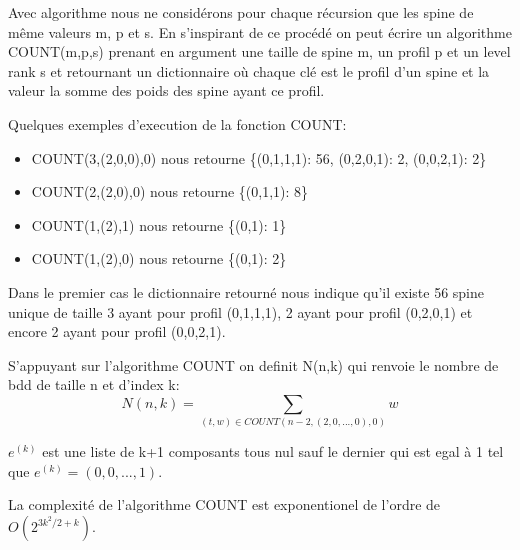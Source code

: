 \documentclass[french]{article}
\begin{document}
Avec algorithme nous ne considérons pour chaque récursion que les spine de même valeurs m, p et s. 
En s'inspirant de ce procédé on peut écrire un algorithme COUNT(m,p,s) prenant en argument une taille de spine m, un profil p et un level rank s et retournant un dictionnaire où chaque clé est le profil d'un spine et la valeur la somme des poids des spine ayant ce profil. 

Quelques exemples d'execution de la fonction COUNT:
\begin{itemize}
    \item COUNT(3,(2,0,0),0) nous retourne \{(0,1,1,1): 56, (0,2,0,1): 2, (0,0,2,1): 2\}
    \item COUNT(2,(2,0),0) nous retourne  \{(0,1,1): 8\}
    \item COUNT(1,(2),1) nous retourne \{(0,1): 1\}
    \item COUNT(1,(2),0) nous retourne \{(0,1): 2\}
\end{itemize}

Dans le premier cas le dictionnaire retourné nous indique qu'il existe 56 spine unique de taille 3 ayant pour profil (0,1,1,1), 2 ayant pour profil (0,2,0,1) et encore 2 ayant pour profil (0,0,2,1).

\vspace{5mm} %

S'appuyant sur l'algorithme COUNT on definit N(n,k) qui renvoie le nombre de bdd de taille n et d'index k:
\[N(n,k)=\underset{(t,w)\in COUNT(n-2,(2,0,...,0),0)}{\sum} w\]

\(e^{(k)}\) est une liste de k+1 composants tous nul sauf le dernier qui est egal à 1 tel que \(e^{(k)} = (0,0,...,1)\).

La complexité de l'algorithme COUNT est exponentionel de l'ordre de \(O(2^{3k^2/2+k})\).
\end{document}
